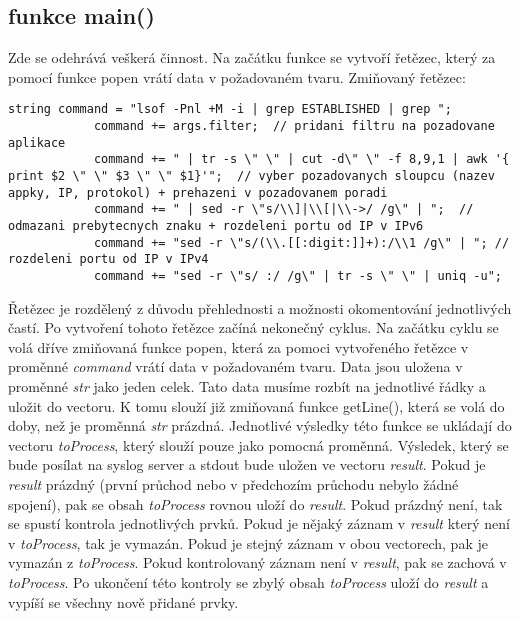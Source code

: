 \documentclass[a4paper]{article}
\begin{document}
	\subsection{funkce main()}
	\begin{sloppypar}
	Zde se odehrává veškerá činnost. Na začátku funkce se vytvoří řetězec, který za pomocí funkce popen vrátí data v požadovaném tvaru.
	\newline
	Zmiňovaný řetězec:
		\begin{lstlisting}[breaklines]
			string command = "lsof -Pnl +M -i | grep ESTABLISHED | grep ";
			command += args.filter;  // pridani filtru na pozadovane aplikace 
			command += " | tr -s \" \" | cut -d\" \" -f 8,9,1 | awk '{ print $2 \" \" $3 \" \" $1}'";  // vyber pozadovanych sloupcu (nazev appky, IP, protokol) + prehazeni v pozadovanem poradi
			command += " | sed -r \"s/\\]|\\[|\\->/ /g\" | ";  // odmazani prebytecnych znaku + rozdeleni portu od IP v IPv6
			command += "sed -r \"s/(\\.[[:digit:]]+):/\\1 /g\" | "; // rozdeleni portu od IP v IPv4
			command += "sed -r \"s/ :/ /g\" | tr -s \" \" | uniq -u";
		\end{lstlisting}
	Řetězec je rozdělený z důvodu přehlednosti a možnosti okomentování jednotlivých častí. Po vytvoření tohoto řetězce začíná nekonečný cyklus. Na začátku cyklu se volá dříve zmiňovaná funkce popen, která za pomoci vytvořeného řetězce v proměnné \emph{command} vrátí data v požadovaném tvaru. Data jsou uložena v proměnné \emph{str} jako jeden celek. Tato data musíme rozbít na jednotlivé řádky a uložit do vectoru. K tomu slouží již zmiňovaná funkce getLine(), která se volá do doby, než je proměnná \emph{str} prázdná. Jednotlivé výsledky této funkce se ukládají do vectoru \emph{toProcess}, který slouží pouze jako pomocná proměnná. Výsledek, který se bude posílat na syslog server a stdout bude uložen ve vectoru \emph{result}. Pokud je \emph{result} prázdný (první průchod nebo v předchozím průchodu nebylo žádné spojení), pak se obsah \emph{toProcess} rovnou uloží do \emph{result}. Pokud prázdný není, tak se spustí kontrola jednotlivých prvků. Pokud je nějaký záznam v \emph{result} který není v \emph{toProcess}, tak je vymazán. Pokud je stejný záznam v obou vectorech, pak je vymazán z \emph{toProcess}. Pokud kontrolovaný záznam není v \emph{result}, pak se zachová v \emph{toProcess}. Po ukončení této kontroly se zbylý obsah \emph{toProcess} uloží do \emph{result} a vypíší se všechny nově přidané prvky. 
	\end{sloppypar}
\end{document}
